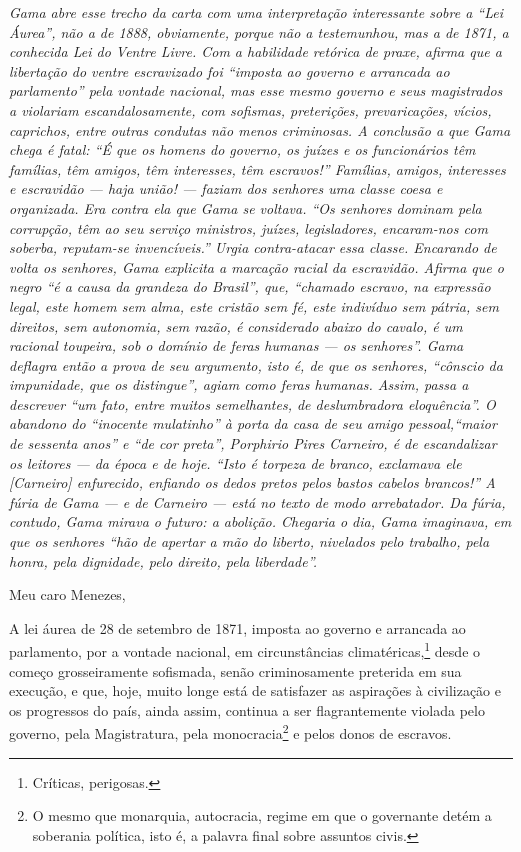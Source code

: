 \begin{resumo}
\emph{Gama abre esse trecho da carta com uma interpretação interessante
sobre a ``Lei Áurea'', não a de 1888, obviamente, porque não a
testemunhou, mas a de 1871, a conhecida Lei do Ventre Livre. Com a
habilidade retórica de praxe, afirma que a libertação do ventre
escravizado foi ``imposta ao governo e arrancada ao parlamento'' pela
vontade nacional, mas esse mesmo governo e seus magistrados a violariam
escandalosamente, com sofismas, preterições, prevaricações, vícios,
caprichos, entre outras condutas não menos criminosas. A conclusão a que
Gama chega é fatal: ``É que os homens do governo, os juízes e os
funcionários têm famílias, têm amigos, têm interesses, têm escravos!''
Famílias, amigos, interesses e escravidão --- haja união! --- faziam dos
senhores uma classe coesa e organizada. Era contra ela que Gama se
voltava. ``Os senhores dominam pela corrupção, têm ao seu serviço
ministros, juízes, legisladores, encaram-nos com soberba, reputam-se
invencíveis.'' Urgia contra-atacar essa classe. Encarando de volta os
senhores, Gama explicita a marcação racial da escravidão. Afirma que o
negro ``é a causa da grandeza do Brasil'', que, ``chamado escravo, na
expressão legal, este homem sem alma, este cristão sem fé, este
indivíduo sem pátria, sem direitos, sem autonomia, sem razão, é
considerado abaixo do cavalo, é um racional toupeira, sob o domínio de
feras humanas --- os senhores''. Gama deflagra então a prova de seu
argumento, isto é, de que os senhores, ``cônscio da impunidade, que os
distingue'', agiam como feras humanas. Assim, passa a descrever ``um fato,
entre muitos semelhantes, de deslumbradora eloquência''. O abandono do
``inocente mulatinho'' à porta da casa de seu amigo pessoal,``maior de
sessenta anos'' e ``de cor preta'', Porphirio Pires Carneiro, é de
escandalizar os leitores --- da época e de hoje. ``Isto é torpeza de
branco, exclamava ele {[}Carneiro{]} enfurecido, enfiando os dedos
pretos pelos bastos cabelos brancos!'' A fúria de Gama --- e de Carneiro
--- está no texto de modo arrebatador. Da fúria, contudo, Gama mirava o
futuro: a abolição. Chegaria o dia, Gama imaginava, em que os senhores
``hão de apertar a mão do liberto, nivelados pelo trabalho, pela honra,
pela dignidade, pelo direito, pela liberdade''. }
\end{resumo}

Meu caro Menezes,

A lei áurea de 28 de setembro de 1871, imposta ao governo e arrancada ao
parlamento, por a vontade nacional, em circunstâncias
climatéricas,\footnote{Críticas, perigosas.} desde o começo
grosseiramente sofismada, senão criminosamente preterida em sua
execução, e que, hoje, muito longe está de satisfazer as aspirações à
civilização e os progressos do país, ainda assim, continua a ser
flagrantemente violada pelo governo, pela Magistratura, pela
monocracia\footnote{O mesmo que monarquia, autocracia, regime em que o
  governante detém a soberania política, isto é, a palavra final sobre
  assuntos civis.} e pelos donos de escravos.

